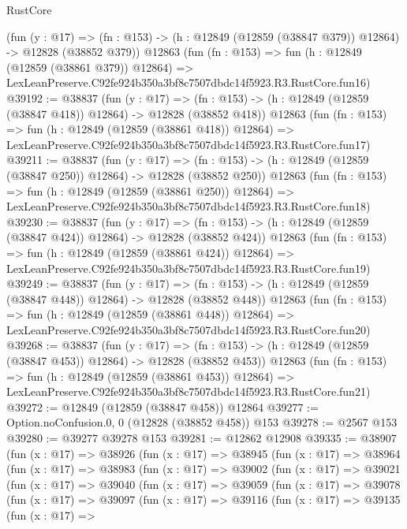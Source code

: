 \begin{lexlean}{RustCore}
\begin{coremodule}
    (fun (y : @17) =>
    (fn : @153) -> (h : @12849 (@12859 (@38847 @379)) @12864) -> @12828 (@38852 @379))
    @12863
    (fun (fn : @153) =>
    fun (h : @12849 (@12859 (@38861 @379)) @12864) =>
    LexLeanPreserve.C92fe924b350a3bf8c7507dbdc14f5923.R3.RustCore.fun16)
@39192 := @38837
    (fun (y : @17) =>
    (fn : @153) -> (h : @12849 (@12859 (@38847 @418)) @12864) -> @12828 (@38852 @418))
    @12863
    (fun (fn : @153) =>
    fun (h : @12849 (@12859 (@38861 @418)) @12864) =>
    LexLeanPreserve.C92fe924b350a3bf8c7507dbdc14f5923.R3.RustCore.fun17)
@39211 := @38837
    (fun (y : @17) =>
    (fn : @153) -> (h : @12849 (@12859 (@38847 @250)) @12864) -> @12828 (@38852 @250))
    @12863
    (fun (fn : @153) =>
    fun (h : @12849 (@12859 (@38861 @250)) @12864) =>
    LexLeanPreserve.C92fe924b350a3bf8c7507dbdc14f5923.R3.RustCore.fun18)
@39230 := @38837
    (fun (y : @17) =>
    (fn : @153) -> (h : @12849 (@12859 (@38847 @424)) @12864) -> @12828 (@38852 @424))
    @12863
    (fun (fn : @153) =>
    fun (h : @12849 (@12859 (@38861 @424)) @12864) =>
    LexLeanPreserve.C92fe924b350a3bf8c7507dbdc14f5923.R3.RustCore.fun19)
@39249 := @38837
    (fun (y : @17) =>
    (fn : @153) -> (h : @12849 (@12859 (@38847 @448)) @12864) -> @12828 (@38852 @448))
    @12863
    (fun (fn : @153) =>
    fun (h : @12849 (@12859 (@38861 @448)) @12864) =>
    LexLeanPreserve.C92fe924b350a3bf8c7507dbdc14f5923.R3.RustCore.fun20)
@39268 := @38837
    (fun (y : @17) =>
    (fn : @153) -> (h : @12849 (@12859 (@38847 @453)) @12864) -> @12828 (@38852 @453))
    @12863
    (fun (fn : @153) =>
    fun (h : @12849 (@12859 (@38861 @453)) @12864) =>
    LexLeanPreserve.C92fe924b350a3bf8c7507dbdc14f5923.R3.RustCore.fun21)
@39272 := @12849 (@12859 (@38847 @458)) @12864
@39277 := Option.noConfusion.{0, 0} (@12828 (@38852 @458)) @153
@39278 := @2567 @153
@39280 := @39277 @39278 @153
@39281 := @12862 @12908
@39335 := @38907
    (fun (x : @17) =>
    @38926
      (fun (x : @17) =>
      @38945
        (fun (x : @17) =>
        @38964
          (fun (x : @17) =>
          @38983
            (fun (x : @17) =>
            @39002
              (fun (x : @17) =>
              @39021
                (fun (x : @17) =>
                @39040
                  (fun (x : @17) =>
                  @39059
                    (fun (x : @17) =>
                    @39078
                      (fun (x : @17) =>
                      @39097
                        (fun (x : @17) =>
                        @39116
                          (fun (x : @17) =>
                          @39135
                            (fun (x : @17) =>

\end{coremodule}
\end{lexlean}
